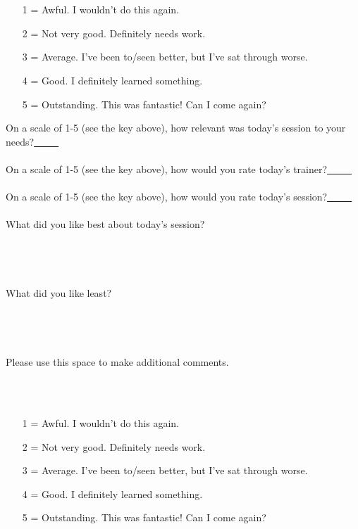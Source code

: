 

\noindent


\ \\
\ \\

\begin{enumerate}
\item[1] = Awful. I wouldn't do this again.
\item[2] = Not very good. Definitely needs work.
\item[3] = Average. I've been to/seen better, but I've sat through worse.
\item[4] = Good. I definitely learned something.
\item[5] = Outstanding. This was fantastic! Can I come again?
\end{enumerate}

On a scale of 1-5 (see the key above), how relevant was today's session to your needs?\underline{\ \ \ \ \ }
\ \\
\ \\
On a scale of 1-5 (see the key above), how would you rate today's trainer?\underline{\ \ \ \ \ }
\ \\
\ \\
On a scale of 1-5 (see the key above), how would you rate today's session?\underline{\ \ \ \ \ }
\ \\
\ \\
What did you like best about today's session?
\ \\
\ \\
\ \\
\ \\
\ \\
What did you like least?
\ \\
\ \\
\ \\
\ \\
\ \\
Please use this space to make additional comments.

\newpage


\ \\
\ \\

\begin{enumerate}
\item[1] = Awful. I wouldn't do this again.
\item[2] = Not very good. Definitely needs work.
\item[3] = Average. I've been to/seen better, but I've sat through worse.
\item[4] = Good. I definitely learned something.
\item[5] = Outstanding. This was fantastic! Can I come again?
\end{enumerate}

